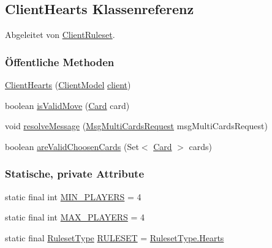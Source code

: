 \hypertarget{a00055}{\subsection{Client\-Hearts Klassenreferenz}
\label{a00055}
}


Abgeleitet von \hyperlink{a00056}{Client\-Ruleset}.

\subsubsection*{Öffentliche Methoden}
\begin{DoxyCompactItemize}
\item 
\hyperlink{a00055_ad8d72cec687ab04aa0ed6f2167b6dc33}{Client\-Hearts} (\hyperlink{a00003}{Client\-Model} \hyperlink{a00056_a937cb3d928d5cde5863e895e163b048e}{client})
\item 
boolean \hyperlink{a00055_aa58080772a961e1f9f88d766777f82ed}{is\-Valid\-Move} (\hyperlink{a00054}{Card} card)
\item 
void \hyperlink{a00055_ad32794205bdb1ca1a8760cea29d6b27a}{resolve\-Message} (\hyperlink{a00047}{Msg\-Multi\-Cards\-Request} msg\-Multi\-Cards\-Request)
\item 
boolean \hyperlink{a00055_a8f8cd3193789d852ab22bb9e858fa5c4}{are\-Valid\-Choosen\-Cards} (Set$<$ \hyperlink{a00054}{Card} $>$ cards)
\end{DoxyCompactItemize}
\subsubsection*{Statische, private Attribute}
\begin{DoxyCompactItemize}
\item 
\hypertarget{a00055_a57fe2c01c4e61b1f0c44c70ccc75d903}{static final int \hyperlink{a00055_a57fe2c01c4e61b1f0c44c70ccc75d903}{M\-I\-N\-\_\-\-P\-L\-A\-Y\-E\-R\-S} = 4}\label{a00055_a57fe2c01c4e61b1f0c44c70ccc75d903}

\item 
\hypertarget{a00055_ae6ed433235a83c520ce79bee49bc2b01}{static final int \hyperlink{a00055_ae6ed433235a83c520ce79bee49bc2b01}{M\-A\-X\-\_\-\-P\-L\-A\-Y\-E\-R\-S} = 4}\label{a00055_ae6ed433235a83c520ce79bee49bc2b01}

\item 
\hypertarget{a00055_a3045f525de18ff0ad68134f0d512ea16}{static final \hyperlink{a00066}{Ruleset\-Type} \hyperlink{a00055_a3045f525de18ff0ad68134f0d512ea16}{R\-U\-L\-E\-S\-E\-T} = \hyperlink{a00066_a6e9f988fd4b1f5b39d289b0f44514af4}{Ruleset\-Type.\-Hearts}}\label{a00055_a3045f525de18ff0ad68134f0d512ea16}

\end{DoxyCompactItemize}
